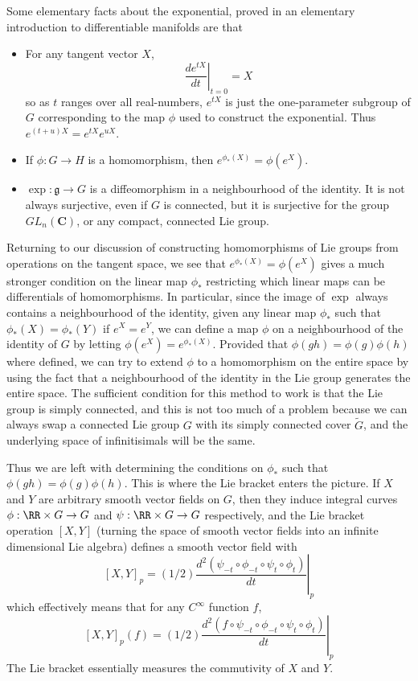 Some elementary facts about the exponential, proved in an elementary introduction to differentiable manifolds are that
%
\begin{itemize}
    \item For any tangent vector $X$,
    \[ \left. \frac{de^{tX}}{dt} \right|_{t = 0} = X \]
    so as $t$ ranges over all real-numbers, $e^{tX}$ is just the one-parameter subgroup of $G$ corresponding to the map $\phi$ used to construct the exponential. Thus $e^{(t + u)X} = e^{tX} e^{uX}$.

    \item If $\phi: G \to H$ is a homomorphism, then $e^{\phi_*(X)} = \phi(e^X)$.

    \item $\exp: \mathfrak{g} \to G$ is a diffeomorphism in a neighbourhood of the identity. It is not always surjective, even if $G$ is connected, but it is surjective for the group $GL_n(\mathbf{C})$, or any compact, connected Lie group.
\end{itemize}
%
Returning to our discussion of constructing homomorphisms of Lie groups from operations on the tangent space, we see that $e^{\phi_*(X)} = \phi(e^X)$ gives a much stronger condition on the linear map $\phi_*$ restricting which linear maps can be differentials of homomorphisms. In particular, since the image of $\exp$ always contains a neighbourhood of the identity, given any linear map $\phi_*$ such that $\phi_*(X) = \phi_*(Y)$ if $e^X = e^Y$, we can define a map $\phi$ on a neighbourhood of the identity of $G$ by letting $\phi(e^X) = e^{\phi_*(X)}$. Provided that $\phi(gh) = \phi(g)\phi(h)$ where defined, we can try to extend $\phi$ to a homomorphism on the entire space by using the fact that a neighbourhood of the identity in the Lie group generates the entire space. The sufficient condition for this method to work is that the Lie group is simply connected, and this is not too much of a problem because we can always swap a connected Lie group $G$ with its simply connected cover $\tilde{G}$, and the underlying space of infinitisimals will be the same.

Thus we are left with determining the conditions on $\phi_*$ such that $\phi(gh) = \phi(g) \phi(h)$. This is where the Lie bracket enters the picture. If $X$ and $Y$ are arbitrary smooth vector fields on $G$, then they induce integral curves $\phi: \RR \times G \to G$ and $\psi: \RR \times G \to G$ respectively, and the Lie bracket operation $[X,Y]$ (turning the space of smooth vector fields into an infinite dimensional Lie algebra) defines a smooth vector field with
%
\[ [X,Y]_p = (1/2) \left. \frac{d^2 (\psi_{-t} \circ \phi_{-t} \circ \psi_t \circ \phi_t)}{dt} \right|_p \]
%
which effectively means that for any $C^\infty$ function $f$,
%
\[ [X,Y]_p(f) = (1/2) \left. \frac{d^2 (f \circ \psi_{-t} \circ \phi_{-t} \circ \psi_t \circ \phi_t)}{dt} \right|_p \]
%
The Lie bracket essentially measures the commutivity of $X$ and $Y$.

